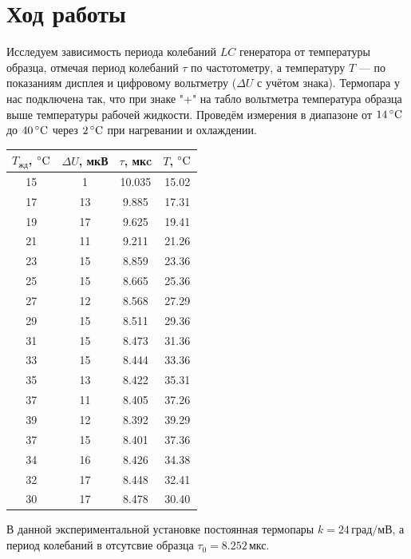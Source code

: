 \documentclass[12pt]{article}
\begin{document}
\section*{Ход работы}
\par	
	Исследуем зависимость периода колебаний $LC$ генератора от температуры образца, отмечая период колебаний $\tau$ по частотометру, а температуру $T$ --- по показаниям дисплея и цифровому вольтметру ($\Delta U$ с учётом знака). Термопара у нас подключена так, что при знаке "+" на табло вольтметра температура образца выше температуры рабочей жидкости. Проведём измерения в диапазоне от $14 \, \degree \text{C}$ до $40 \, \degree \text{C}$ через $2 \, \degree \text{C}$ при нагревании и охлаждении.	
\begin{table}[h!]
	\centering
	\begin{tabular}{|c|c|c|c|}
	\hline
	$T_\text{жд}$, ${\degree \text{C}}$ & $\Delta U$, мкВ & $\tau$, мкc & $T$, $\degree \text{C}$ \\
	\hline	
	15&	1&	10.035&	15.02 \\
	\hline
	17&	13&	9.885&	17.31 \\
	\hline
	19&	17&	9.625&	19.41 \\
	\hline
	21&	11&	9.211&	21.26 \\
	\hline
	23&	15&	8.859&	23.36 \\
	\hline
	25&	15&	8.665&	25.36 \\
	\hline
	27&	12&	8.568&	27.29 \\
	\hline
	29&	15&	8.511&	29.36 \\
	\hline
	31&	15&	8.473&	31.36 \\
	\hline
	33&	15&	8.444&	33.36 \\
	\hline
	35&	13&	8.422& 	35.31 \\
	\hline
	37&	11&	8.405	& 37.26 \\
	\hline
	39&	12&	8.392 &	39.29 \\
	\hline
	\hline
	37	&15&	8.401&	37.36 \\
	\hline
	34	&16	&8.426&	34.38 \\
	\hline
	32	&17	&8.448&	32.41 \\
	\hline
	30&	17	&8.478&	30.40 \\
	\hline
	\end{tabular}	
\end{table}
\par
	В данной экспериментальной установке постоянная термопары $k = 24 \, \text{град/мВ}$, а период колебаний в отсутсвие образца $\tau_0 = 8.252 \, \text{мкс}$.
\end{document}
